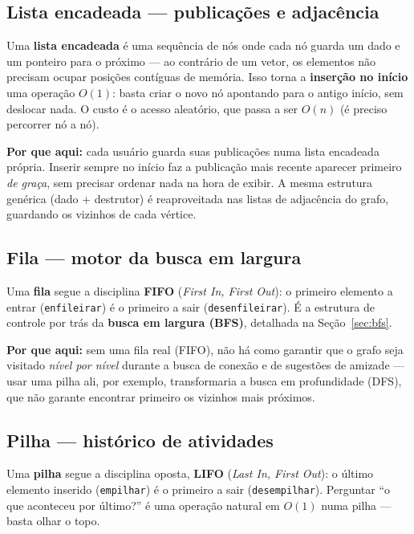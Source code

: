 \documentclass[11pt,a4paper]{article}
\newcommand{\code}[1]{\texttt{#1}}
\begin{document}
\subsection{Lista encadeada --- publicações e adjacência}

Uma \textbf{lista encadeada} é uma sequência de nós onde cada nó guarda um
dado e um ponteiro para o próximo --- ao contrário de um vetor, os elementos
não precisam ocupar posições contíguas de memória. Isso torna a
\textbf{inserção no início} uma operação $O(1)$: basta criar o novo nó
apontando para o antigo início, sem deslocar nada. O custo é o acesso
aleatório, que passa a ser $O(n)$ (é preciso percorrer nó a nó).

\textbf{Por que aqui:} cada usuário guarda suas publicações numa lista
encadeada própria. Inserir sempre no início faz a publicação mais recente
aparecer primeiro \emph{de graça}, sem precisar ordenar nada na hora de
exibir. A mesma estrutura genérica (dado + destrutor) é reaproveitada nas
listas de adjacência do grafo, guardando os vizinhos de cada vértice.

\subsection{Fila --- motor da busca em largura}

Uma \textbf{fila} segue a disciplina \textbf{FIFO} (\emph{First In, First
Out}): o primeiro elemento a entrar (\code{enfileirar}) é o primeiro a sair
(\code{desenfileirar}). É a estrutura de controle por trás da
\textbf{busca em largura (BFS)}, detalhada na Seção~\ref{sec:bfs}.

\textbf{Por que aqui:} sem uma fila real (FIFO), não há como garantir que o
grafo seja visitado \emph{nível por nível} durante a busca de conexão e de
sugestões de amizade --- usar uma pilha ali, por exemplo, transformaria a
busca em profundidade (DFS), que não garante encontrar primeiro os vizinhos
mais próximos.

\subsection{Pilha --- histórico de atividades}

Uma \textbf{pilha} segue a disciplina oposta, \textbf{LIFO} (\emph{Last In,
First Out}): o último elemento inserido (\code{empilhar}) é o primeiro a
sair (\code{desempilhar}). Perguntar ``o que aconteceu por último?'' é uma
operação natural em $O(1)$ numa pilha --- basta olhar o topo.
\end{document}
